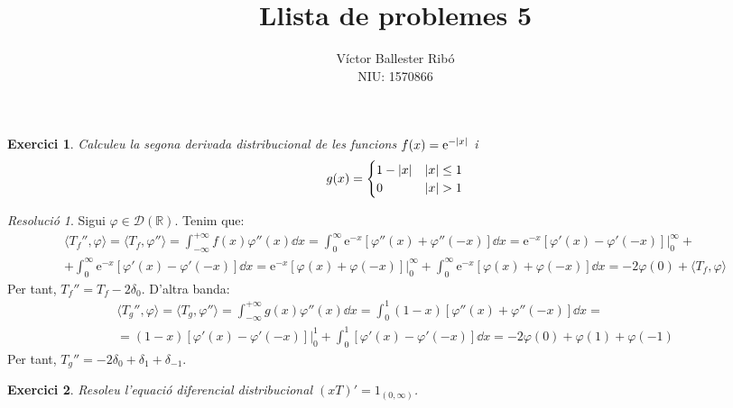 \documentclass[10pt,a4paper]{article}
\title{\bfseries\Large Llista de problemes 5}
\author{Víctor Ballester Ribó\\NIU: 1570866}
\date{\parbox{\linewidth}{\centering
  Anàlisi Harmònica\endgraf
  Grau en Matemàtiques\endgraf
  Universitat Autònoma de Barcelona\endgraf
  Abril de 2023}}
\newcommand{\RR}{\ensuremath{\mathbb{R}}} %
\newcommand{\vf}[1]{\boldsymbol{\mathrm{#1}}} %
\newtheorem{exercici}{Exercici}
\theoremstyle{definition}
\theoremstyle{remark}
\newtheorem*{res}{Resolució}
\renewcommand{\exp}[1]{\mathrm{e}^{#1}} %
\begin{document}
\maketitle
\begin{exercici}
  Calculeu la segona derivada distribucional de les funcions $f(x)=\exp{-\abs{x}}$ i
  $$
    g(x)=\begin{cases}
      1-\abs{x} & \abs{x}\leq 1 \\
      0         & \abs{x}>1
    \end{cases}
  $$
\end{exercici}
\begin{res}
  Sigui $\varphi\in\mathcal{D}(\RR)$. Tenim que:
  \begin{multline*}
    \langle T_f'',\varphi\rangle = \langle T_f,\varphi''\rangle=\int_{-\infty}^{+\infty}f(x)\varphi''(x) \dd{x}=\int_{0}^{\infty}\exp{-x}[\varphi''(x) +\varphi''(-x)] \dd{x}=\exp{-x}[\varphi'(x) -\varphi'(-x)]\Big|_0^\infty+\\+\int_{0}^{\infty}\exp{-x}[\varphi'(x) -\varphi'(-x)] \dd{x}=\exp{-x}[\varphi(x) +\varphi(-x)]\Big|_0^\infty+\int_{0}^{\infty}\exp{-x}[\varphi(x) +\varphi(-x)] \dd{x}=-2\varphi(0)+\langle T_f,\varphi\rangle
  \end{multline*}
  Per tant, $T_f''=T_f-2\delta_0$. D'altra banda:
  \begin{multline*}
    \langle T_g'',\varphi\rangle = \langle T_g,\varphi''\rangle=\int_{-\infty}^{+\infty}g(x)\varphi''(x) \dd{x}=\int_{0}^{1}(1-x)[\varphi''(x)+\varphi''(-x)] \dd{x}=\\=(1-x)[\varphi'(x)-\varphi'(-x)]\Big|_0^{1}+\int_{0}^{1}[\varphi'(x)-\varphi'(-x)] \dd{x}=-2\varphi(0)+\varphi(1) +\varphi(-1)
  \end{multline*}
  Per tant, $T_g''=-2\delta_0+\delta_1+\delta_{-1}$.
\end{res}
\begin{exercici}
  Resoleu l'equació diferencial distribucional ${(xT)}'=\vf{1}_{(0,\infty)}$.
\end{exercici}
\end{document}
